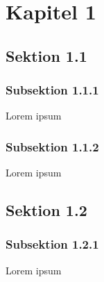 \chapter{Kapitel 1}

\section{Sektion 1.1}

\subsection{Subsektion 1.1.1}
\label{sec:Subsektion 1.1.1}
Lorem ipsum

\subsection{Subsektion 1.1.2}
Lorem ipsum\\

\section{Sektion 1.2}
\subsection{Subsektion 1.2.1}
Lorem ipsum